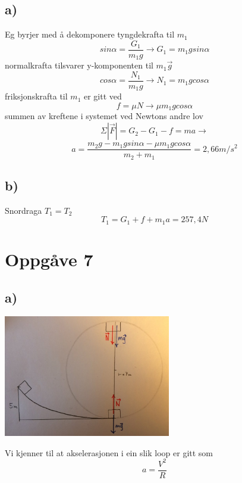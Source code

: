 \documentclass[12pt,a4paper]{article}
\begin{document}
    \subsection*{a)}
    Eg byrjer med å dekomponere tyngdekrafta til $m_1$
    \begin{equation}
      sin\alpha = \frac{G_1}{m_1g} \rightarrow G_1 = m_1gsin\alpha
    \end{equation}
    normalkrafta tilsvarer y-komponenten til $m_1\vec{g}$
    \begin{equation}
      cos\alpha = \frac{N_1}{m_1g} \rightarrow N_1 = m_1gcos\alpha
    \end{equation}
    friksjonskrafta til $m_1$ er gitt ved
    \begin{equation}
      f = \mu N \rightarrow \mu m_1gcos\alpha
    \end{equation}
    summen av kreftene i systemet ved Newtons andre lov
    \begin{equation}
      \Sigma |\vec{F}| = G_2 - G_1 - f = ma \rightarrow
    \end{equation}
    \begin{equation}
      a = \frac{m_2g - m_1gsin\alpha - \mu m_1gcos\alpha}{m_2 + m_1} = 2,66m/s^2
    \end{equation}

    \subsection*{b)}
    Snordraga $T_1 = T_2$
    \begin{equation}
      T_1 = G_1 + f + m_1a = 257,4N
    \end{equation}

  \section*{Oppgåve 7}
    \subsection*{a)}
    \begin{center}
      \includegraphics[width=73mm]{02_07}
    \end{center}
    Vi kjenner til at akselerasjonen i ein slik loop er gitt som
    \begin{equation}
      a = \frac{V^2}{R}
    \end{equation}
\end{document}
